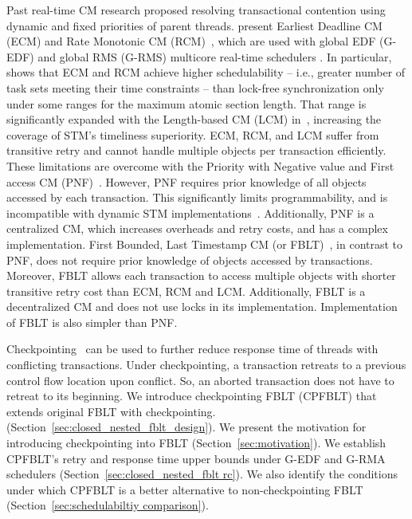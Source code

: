 \documentclass[preprint]{sigplanconf}
\begin{document}
Past real-time CM research proposed resolving transactional contention using dynamic and fixed priorities of parent threads. \cite{6045438,stmconcurrencycontrol:emsoft11,lcmdac2012} present  Earliest Deadline CM (ECM) and Rate Monotonic CM (RCM)~, which are used with global EDF (G-EDF) and global RMS (G-RMS) multicore real-time schedulers \cite{Davis:2011:SHR:1978802.1978814}.
In particular,~\cite{stmconcurrencycontrol:emsoft11} shows that ECM and RCM achieve higher schedulability -- i.e., greater number of task sets meeting their time constraints -- than lock-free synchronization only under some ranges for the maximum atomic section length. That range is significantly expanded with the Length-based CM (LCM) in~\cite{lcmdac2012}, increasing the coverage of STM's timeliness superiority. ECM, RCM, and LCM suffer from transitive retry and cannot handle multiple objects per transaction efficiently. These limitations are overcome with the Priority with Negative value and First access CM (PNF)~\cite{pnf_dac_asp,shambake_phd_proposal}. However, PNF requires prior knowledge of all objects accessed by each transaction. This significantly limits programmability, and is incompatible with dynamic STM implementations~\cite{Herlihy:2003:STM:872035.872048}. Additionally, PNF is a centralized CM, which increases overheads and retry costs, and has a complex implementation. First Bounded, Last Timestamp CM (or FBLT)~\cite{fblt}, in contrast to PNF, does not require prior knowledge of objects accessed by transactions. Moreover, FBLT allows each transaction to access multiple objects with shorter transitive retry cost than ECM, RCM and LCM. Additionally, FBLT is a decentralized CM and does not use locks in its implementation. Implementation of FBLT is also simpler than PNF.

Checkpointing~\cite{Koskinen:2008:CCI:1378533.1378563} can be used to further reduce response time of threads with conflicting transactions. Under checkpointing, a transaction retreats to a previous control flow location upon conflict. So, an aborted transaction does not have to retreat to its beginning.
We introduce checkpointing FBLT (CPFBLT) that extends original FBLT with checkpointing. (Section~\ref{sec:closed_nested_fblt_design}). We present the motivation for introducing checkpointing into FBLT (Section~\ref{sec:motivation}). We establish CPFBLT's retry and response time upper bounds under G-EDF and G-RMA schedulers (Section~\ref{sec:closed_nested_fblt rc}). We also identify the conditions under which CPFBLT is a better alternative to non-checkpointing FBLT (Section~\ref{sec:schedulabiltiy comparison}).
\end{document}
